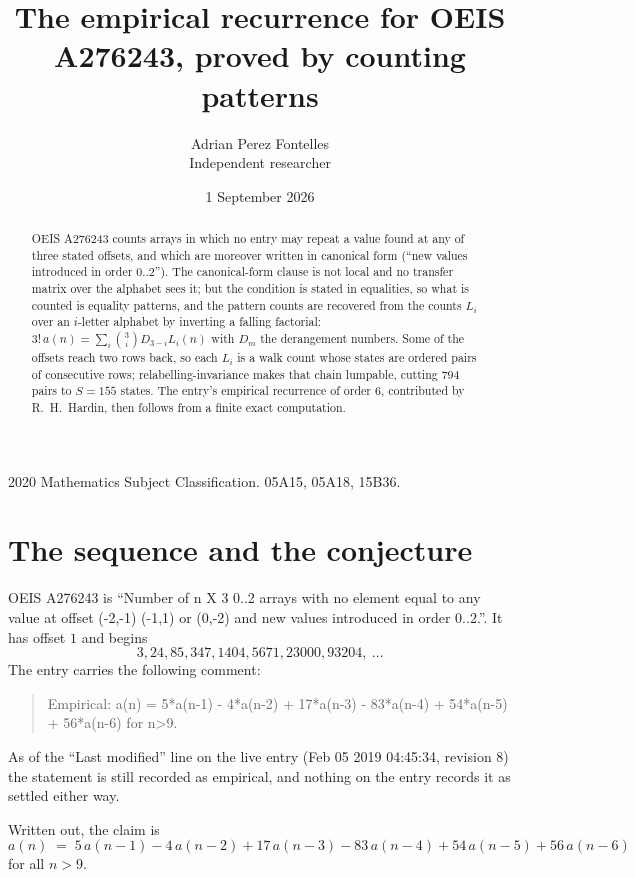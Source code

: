 \documentclass[11pt,a4paper]{article}
\title{The empirical recurrence for OEIS A276243, proved by counting patterns}
\author{Adrian Perez Fontelles\\ \small Independent researcher}
\date{1 September 2026}
\theoremstyle{plain}
\theoremstyle{definition}
\begin{document}
\maketitle

\begin{abstract}
OEIS A276243 counts arrays in which no entry may repeat a value found at any of three stated
offsets, and which are moreover written in canonical form (``new values introduced in order
$0..2$''). The canonical-form clause is not local and no transfer matrix over the
alphabet sees it; but the condition is stated in equalities, so what is counted is equality
patterns, and the pattern counts are recovered from the counts $L_i$ over an $i$-letter
alphabet by inverting a falling factorial:
$3!\,a(n)=\sum_i\binom{3}{i}D_{3-i}L_i(n)$ with $D_m$ the derangement numbers.
Some of the offsets reach two rows back, so each $L_i$ is a walk count whose states are
ordered pairs of consecutive rows; relabelling-invariance makes that chain lumpable,
cutting $794$ pairs to $S=155$ states. The entry's empirical recurrence of order $6$,
contributed by R.~H.~Hardin, then follows from a finite exact computation.
\end{abstract}

\noindent\small 2020 Mathematics Subject Classification. 05A15, 05A18, 15B36.\normalsize

\section{The sequence and the conjecture}

OEIS A276243 is ``Number of n X 3 0..2 arrays with no element equal to any value at offset (-2,-1) (-1,1) or (0,-2) and new values introduced in order 0..2.''. It has offset $1$ and begins
\[
3, 24, 85, 347, 1404, 5671, 23000, 93204,\ \dots
\]
The entry carries the following comment:
\begin{quote}\small
Empirical: a(n) = 5*a(n-1) - 4*a(n-2) + 17*a(n-3) - 83*a(n-4) + 54*a(n-5) + 56*a(n-6) for n>9.
\end{quote}
As of the ``Last modified'' line on the live entry (Feb 05 2019 04:45:34, revision 8) the statement is
still recorded as empirical, and nothing on the entry records it as settled either way.

Written out, the claim is
\begin{equation}\label{eq:conj}
a(n)\;=\;5\,a(n-1) - 4\,a(n-2) + 17\,a(n-3) - 83\,a(n-4) + 54\,a(n-5) + 56\,a(n-6)
\end{equation}
for all $n>9$.
\end{document}
